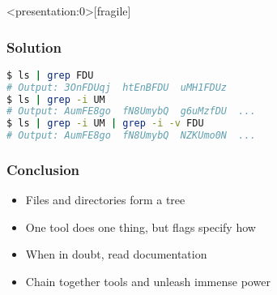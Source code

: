 \begin{frame}<presentation:0>[fragile]
\frametitle{Solution}
\begin{lstlisting}[language=bash]
$ ls | grep FDU
# Output: 3OnFDUqj  htEnBFDU  uMH1FDUz
$ ls | grep -i UM
# Output: AumFE8go  fN8UmybQ  g6uMzfDU  ...
$ ls | grep -i UM | grep -i -v FDU
# Output: AumFE8go  fN8UmybQ  NZKUmo0N  ...
\end{lstlisting}
\end{frame}

\begin{frame}
\frametitle{Conclusion}
\begin{itemize}
    \item Files and directories form a tree
    \item One tool does one thing, but flags specify how
    \item When in doubt, read documentation
    \item Chain together tools and unleash immense power
\end{itemize}
\end{frame}

